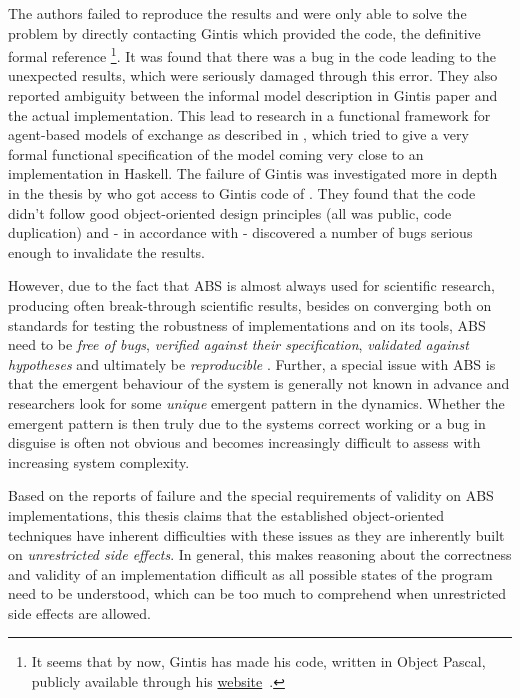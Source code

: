 The authors \cite{ionescu_dependently-typed_2012} failed to reproduce the results and were only able to solve the problem by directly contacting Gintis which provided the code, the definitive formal reference \footnote{It seems that by now, Gintis has made his code, written in Object Pascal, publicly available through his \href{https://people.umass.edu/gintis/}{website}~\cite{gintis_herbert_website}.}. It was found that there was a bug in the code leading to the unexpected results, which were seriously damaged through this error. They also reported ambiguity between the informal model description in Gintis paper and the actual implementation.
This lead to research in a functional framework for agent-based models of exchange as described in \cite{botta_functional_2011}, which tried to give a very formal functional specification of the model coming very close to an implementation in Haskell. The failure of Gintis was investigated more in depth in the thesis by \cite{evensen_extensible_2010} who got access to Gintis code of \cite{gintis_emergence_2006}. They found that the code didn't follow good object-oriented design principles (all was public, code duplication) and - in accordance with \cite{ionescu_dependently-typed_2012} - discovered a number of bugs serious enough to invalidate the results.

\medskip

However, due to the fact that ABS is almost always used for scientific research, producing often break-through scientific results, besides on converging both on standards for testing the robustness of implementations and on its tools, ABS need to be \textit{free of bugs}, \textit{verified against their specification}, \textit{validated against hypotheses} and ultimately be \textit{reproducible} \cite{axelrod_chapter_2006}. Further, a special issue with ABS is that the emergent behaviour of the system is generally not known in advance and researchers look for some \textit{unique} emergent pattern in the dynamics. Whether the emergent pattern is then truly due to the systems correct working or a bug in disguise is often not obvious and becomes increasingly difficult to assess with increasing system complexity. 

Based on the reports of failure and the special requirements of validity on ABS implementations, this thesis claims that the established object-oriented techniques have inherent difficulties with these issues as they are inherently built on \textit{unrestricted side effects}. In general, this makes reasoning about the correctness and validity of an implementation difficult as all possible states of the program need to be understood, which can be too much to comprehend when unrestricted side effects are allowed.

